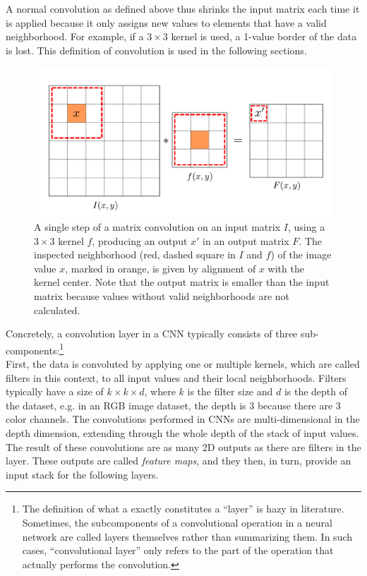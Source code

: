 A normal convolution as defined above thus shrinks the input matrix each time it is applied because it only assigns new values to elements that have a valid neighborhood. For example, if a $3 \times 3$ kernel is used, a 1-value border of the data is lost. This definition of convolution is used in the following sections.\\

\begin {figure}[!htb]
	\begin{center}
		\includegraphics[scale=0.45]{img/fig_convolution}
	\end{center}
	\caption[Matrix convolution.]{A single step of a matrix convolution on an input matrix $I$, using a $3 \times 3$ kernel $f$, producing an output $x'$ in an output matrix $F$. The inspected neighborhood (red, dashed square in $I$ and $f$) of the image value $x$, marked in orange, is given by alignment of $x$ with the kernel center. Note that the output matrix is smaller than the input matrix because values without valid neighborhoods are not calculated.}
	\label{fig:convolution}
\end {figure}

\noindent Concretely, a convolution layer in a CNN typically consists of three sub-components:\footnote{The definition of what a exactly constitutes a ``layer'' is hazy in literature. Sometimes, the subcomponents of a convolutional operation in a neural network are called layers themselves rather than summarizing them. In such cases, ``convolutional layer'' only refers to the part of the operation that actually performs the convolution.}\\

\noindent First, the data is convoluted by applying one or multiple kernels, which are called filters in this context, to all input values and their local neighborhoods. Filters typically have a size of $k \times k \times d$, where $k$ is the filter size and $d$ is the depth of the dataset, e.g. in an RGB image dataset, the depth is 3 because there are 3 color channels. The convolutions performed in CNNs are multi-dimensional in the depth dimension, extending through the whole depth of the stack of input values. The result of these convolutions are as many 2D outputs as there are filters in the layer. These outputs are called \textit{feature maps}, and they then, in turn, provide an input stack for the following layers.

